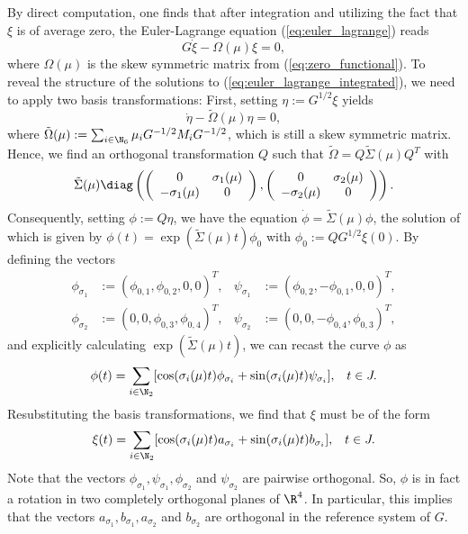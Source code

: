 By direct computation, one finds that after integration and utilizing the fact that $\xi$ is of average zero, the Euler-Lagrange equation (\ref{eq:euler_lagrange}) reads
\begin{equation}
\label{eq:euler_lagrange_integrated}
G \dot{\xi} - \Omega(\mu) \xi = 0,
\end{equation}
where $\Omega(\mu)$ is the skew symmetric matrix from (\ref{eq:zero_functional}). To reveal the structure of the solutions to (\ref{eq:euler_lagrange_integrated}), we need to apply two basis transformations: First, setting $\eta := G^{1/2} \xi$ yields
\begin{equation}
\dot{\eta} - \tilde{\Omega}(\mu) \eta = 0,
\end{equation}
where $\tilde{\Omega}(\mu) := \sum_{i \in \N_6} \mu_i G^{-1/2} M_i G^{-1/2}$, which is still a skew symmetric matrix. Hence, we find an orthogonal transformation $Q$ such that $\tilde{\Omega} = Q \tilde{\Sigma}(\mu) Q^T$ with
\begin{align}
	\tilde{\Sigma}(\mu) \diag \left (\left( \begin{array}{cc}
0 & \sigma_1(\mu) \\ 
- \sigma_1(\mu) & 0
\end{array} \right ) , \left ( \begin{array}{cc}
0 & \sigma_2(\mu) \\
- \sigma_2(\mu) & 0
\end{array} \right ) \right ).
\end{align}
Consequently, setting $\phi := Q \eta$, we have the equation $\dot{\phi} = \tilde{\Sigma}(\mu) \phi$, the solution of which is given by $\phi(t) = \exp \left ( \tilde{\Sigma}(\mu) t \right )\phi_0$ with $\phi_0 := QG^{1/2}\xi(0)$. By defining the vectors
\begin{align}
	\phi_{\sigma_1} &:= (\phi_{0,1}, \phi_{0,2}, 0, 0)^T,  & \psi_{\sigma_1} &:= (\phi_{0,2}, - \phi_{0,1}, 0, 0)^T,\\
	\phi_{\sigma_2} &:= (0,0,\phi_{0,3}, \phi_{0, 4})^T,  & \psi_{\sigma_2} &:= (0,0,- \phi_{0,4}, \phi_{0,3})^T,
\end{align}
and explicitly calculating $\exp(\tilde{\Sigma}(\mu)t)$, we can recast the curve $\phi$ as
\begin{eqnarray}
\phi(t) = \sum_{i \in \N_2} [\cos(\sigma_i(\mu)t) \phi_{\sigma_i} + \sin(\sigma_i(\mu)t) \psi_{\sigma_i}], & & t \in J.
\end{eqnarray}
Resubstituting the basis transformations, we find that $\xi$ must be of the form
\begin{eqnarray}
\label{eq:general_optimal_curve}
\xi(t) = \sum_{i \in \N_2} [\cos(\sigma_i(\mu)t) a_{\sigma_i} + \sin(\sigma_i(\mu)t) b_{\sigma_i}], & & t \in J.
\end{eqnarray}
Note that the vectors $\phi_{\sigma_1}, \psi_{\sigma_1}, \phi_{\sigma_2}$ and $\psi_{\sigma_2}$ are pairwise orthogonal. So, $\phi$ is in fact a rotation in two completely orthogonal planes of $\R^4$. In particular, this implies that the vectors $a_{\sigma_1}, b_{\sigma_1}, a_{\sigma_2}$ and $b_{\sigma_2}$ are orthogonal in the reference system of $G$.

